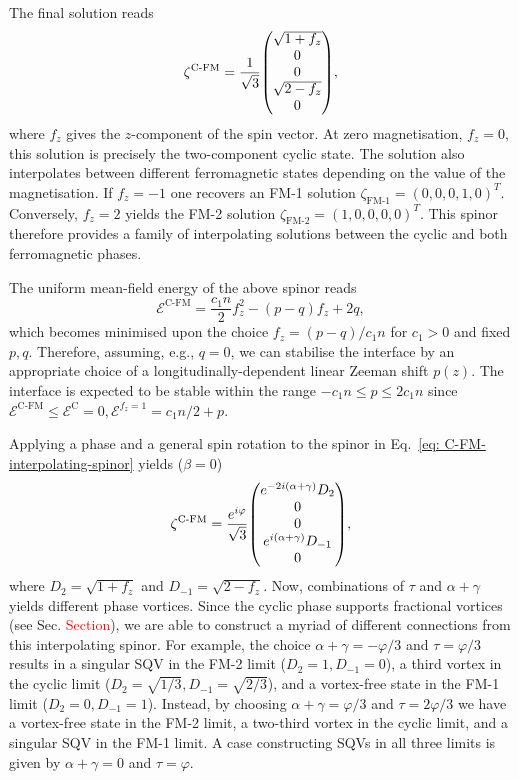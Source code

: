 The final solution reads
\begin{equation}\label{eq: C-FM-interpolating-spinor}
    \zeta^\text{C-FM} = \frac{1}{\sqrt{3}}\mqty(
    \sqrt{1 + f_z} \\
    0 \\
    0 \\
    \sqrt{2 - f_z} \\
    0
    ),
\end{equation}
where \(f_z\) gives the \(z\)-component of the spin vector.
At zero magnetisation, \(f_z = 0\), this solution is precisely the two-component
cyclic state.
The solution also interpolates between different ferromagnetic states depending
on the value of the magnetisation.
If \(f_z = -1\) one recovers an FM-1 solution
\(\zeta_\text{FM-1} = {(0, 0, 0, 1, 0)}^T\).
Conversely, \(f_z = 2\) yields the FM-2 solution
\(\zeta_\text{FM-2} = {(1, 0, 0, 0, 0)}^T\).
This spinor therefore provides a family of interpolating solutions between the
cyclic and both ferromagnetic phases.

The uniform mean-field energy of the above spinor reads
\begin{equation}
    \mathcal{E}^\text{C-FM} = \frac{c_1 n}{2} f_z^2 - (p-q)f_z +2q,
\end{equation}
which becomes minimised upon the choice \(f_z = (p-q)/c_1n\) for \(c_1 > 0\) and
fixed \(p, q\).
Therefore, assuming, e.g., \(q=0\), we can stabilise the interface by an
appropriate choice of a longitudinally-dependent linear Zeeman shift \(p(z)\).
The interface is expected to be stable within the range
\(-c_1n \leq p \leq 2c_1n\) since \(\mathcal{E}^\text{C-FM} \leq
\mathcal{E}^\text{C}=0, \mathcal{E}^{f_z=1} = c_1n/2 + p\).

Applying a phase and a general spin rotation to the spinor in
Eq.~\eqref{eq: C-FM-interpolating-spinor} yields (\(\beta = 0\))
\begin{equation}\label{eq: C-FM-general-spinor}
    \zeta^\text{C-FM} = \frac{e^{i\varphi}}{\sqrt{3}}\mqty(
    e^{-2i(\alpha+\gamma)}D_2 \\
    0 \\
    0 \\
    e^{i(\alpha+\gamma)}D_{-1} \\
    0
    ),
\end{equation}
where \(D_2 = \sqrt{1 + f_z}\) and
\(D_{-1} = \sqrt{2 - f_z}\).
Now, combinations of \(\tau \) and \(\alpha+\gamma \) yields different phase
vortices.
Since the cyclic phase supports fractional vortices
(see Sec. \textcolor{red}{Section}), we are able to construct a myriad of
different connections from this interpolating spinor.
For example, the choice \(\alpha+\gamma=-\varphi/3\) and \(\tau=\varphi/3\)
results in a singular SQV in the FM-2 limit (\(D_2 = 1, D_{-1} = 0\)),
a third vortex in the cyclic limit (\(D_2 = \sqrt{1/3}, D_{-1} = \sqrt{2/3}\)),
and a vortex-free state in the FM-1 limit (\(D_2 = 0, D_{-1} = 1\)).
Instead, by choosing \(\alpha + \gamma = \varphi/3\) and \(\tau = 2\varphi/3\)
we have a vortex-free state in the FM-2 limit, a two-third vortex in the cyclic
limit, and a singular SQV in the FM-1 limit.
A case constructing SQVs in all three limits is given by \(\alpha+\gamma = 0\)
and \(\tau = \varphi \).

